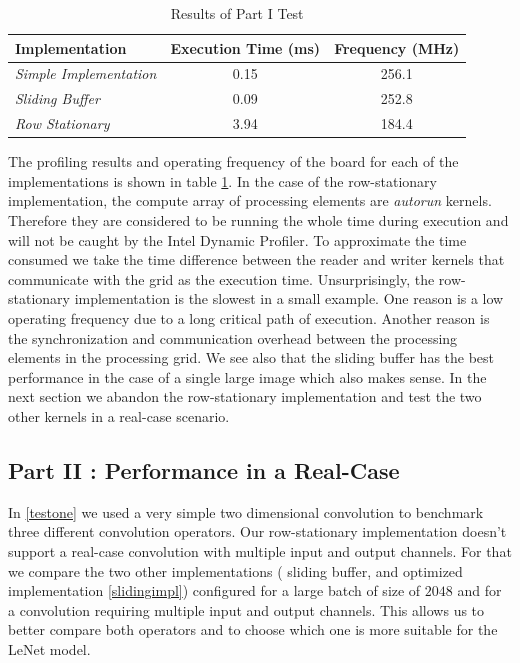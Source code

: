 \begin{table}[]
\centering
\begin{tabular}{|l|c|c|}
\hline
\textbf{Implementation}        & \multicolumn{1}{l|}{\textbf{Execution Time (ms)}} & \multicolumn{1}{l|}{Frequency (MHz)} \\ \hline
\textit{Simple Implementation} & 0.15                                              & 256.1                                \\ \hline
\textit{Sliding Buffer}        & 0.09                                              & 252.8                                \\ \hline
\textit{Row Stationary}        & 3.94                                              & 184.4                                \\ \hline
\end{tabular}
\caption{Results of Part I Test}
\label{tab:resultpartone}
\end{table}

The profiling results and operating frequency of the board for each of the implementations is shown in table \ref{tab:resultpartone}. In the case of the row-stationary implementation, the compute array of processing elements are \emph{autorun} kernels. Therefore they are considered to be running the whole time during execution and will not be caught by the Intel Dynamic Profiler. To approximate the time consumed we take the time difference between the reader and writer kernels that communicate with the grid as the execution time.
Unsurprisingly, the row-stationary implementation is the slowest in a small example. One reason is a low operating frequency due to a long critical path of execution. Another reason is the synchronization and communication overhead between the processing elements in the processing grid. We see also that the sliding buffer has the best performance in the case of a single large image which also makes sense. In the next section we abandon the row-stationary implementation and test the two other kernels in a real-case scenario.


\subsection{Part II : Performance in a Real-Case} 

In \ref{testone} we used a very simple two dimensional convolution to benchmark three different convolution operators. Our row-stationary implementation doesn't support a real-case convolution with multiple input and output channels. For that we compare the two other implementations ( sliding buffer, and optimized implementation \ref{slidingimpl}) configured for a large batch of size of $ 2048 $ and for a convolution requiring multiple input and output channels. This allows us to better compare both operators and to choose which one is more suitable for the LeNet model.

